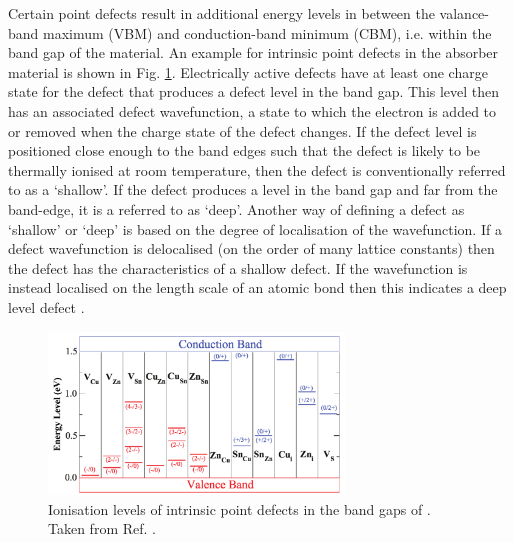 \documentclass[11pt, twoside]{report}
\begin{document}
Certain point defects result in additional energy levels in between the valance-band maximum (VBM) and conduction-band minimum (CBM), i.e. within the band gap of the material. An example for intrinsic point defects in the absorber material {\CZTS} is shown in Fig. \ref{defects_CZTS}. Electrically active defects have at least one charge state for the defect that produces a defect level in the band gap. This level then has an associated defect wavefunction, a state to which the electron is added to or removed when the charge state of the defect changes. If the defect level is positioned close enough to the band edges such that the defect is likely to be thermally ionised at room temperature, then the defect is conventionally referred to as a `shallow'. If the defect produces a level in the band gap and far from the band-edge, it is a referred to as `deep'.  Another way of defining a defect as `shallow' or `deep' is based on the degree of localisation of the wavefunction. If a defect wavefunction is delocalised (on the order of many lattice constants) then the defect has the characteristics of a shallow defect. If the wavefunction is instead localised on the length scale of an atomic bond then this indicates a deep level defect \cite{defects_tutorial}. 

\begin{figure}[h!]
  \centering
    \includegraphics[width=0.7\textwidth]{figures/Chen_CZTS_defects.png}
    \caption[Ionisation levels of intrinsic point defects in the band gaps of {\CZTS}]{Ionisation levels of intrinsic point defects in the band gaps of {\CZTS}. Taken from Ref. .}
  \label{defects_CZTS}
\end{figure}
\end{document}
